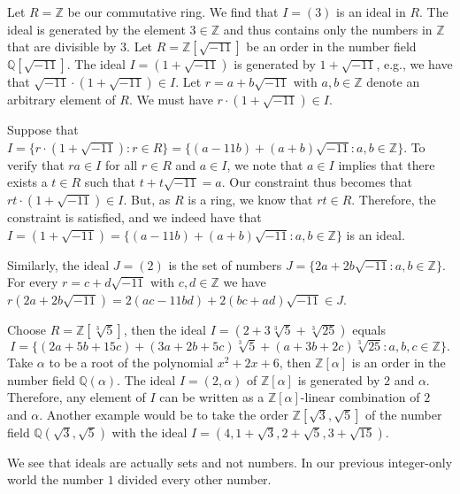 \documentclass[openany, a4paper, 10pt]{book}
\theoremstyle{plain}
\theoremstyle{plain}
\theoremstyle{plain}
\theoremstyle{definition}
\theoremstyle{plain}
\theoremstyle{definition}
\theoremstyle{remark}
\begin{document}
\begin{examplebox}
    Let $R=\mathbb Z$ be our commutative ring.
    We find that $I=(3)$ is an ideal in $R$.
    The ideal is generated by the element $3 \in \mathbb Z$ and thus contains only the numbers in $\mathbb Z$ that are divisible by 3.
    \tcbline
    Let $R=\mathbb Z[\sqrt{-11}]$ be an order in the number field $\mathbb Q[\sqrt{-11}]$.
    The ideal $I=(1+\sqrt{-11})$ is generated by $1+\sqrt{-11}$, e.g., we have that $\sqrt{-11}\cdot (1+\sqrt{-11}) \in I$.
    Let $r=a+b\sqrt{-11}$ with $a,b\in \mathbb Z$ denote an arbitrary element of $R$.
    We must have $r\cdot (1+\sqrt{-11}) \in I$.

    Suppose that
    $I = \{ r\cdot (1+\sqrt{-11}): r \in R \} = \{ (a-11b) + (a+b)\sqrt{-11}: a,b\in \mathbb Z\}$.
    To verify that $ra \in I$ for all $r \in R$ and $a \in I$, we note that $a \in I$ implies that there exists a $t \in R$ such that $t+t\sqrt{-11}=a$.
    Our constraint thus becomes that $rt\cdot (1+\sqrt{-11}) \in I$.
    But, as $R$ is a ring, we know that $rt \in R$.
    Therefore, the constraint is satisfied, and we indeed have that
    $I = (1+\sqrt{-11}) = \{ (a-11b) + (a+b)\sqrt{-11}: a,b\in \mathbb Z\}$ is an ideal.

    Similarly, the ideal $J=(2)$ is the set of numbers $J = \{ 2a + 2b\sqrt{-11}: a,b \in \mathbb Z \}$.
    For every $r=c+d\sqrt{-11}$ with $c,d \in \mathbb Z$ we have $r(2a + 2b \sqrt{-11}) = 2(ac-11bd) + 2(bc+ad)\sqrt{-11} \in J$.

    \tcbline
    Choose $R=\mathbb Z[\sqrt[3]{5}]$, then the ideal $I=(2+3\sqrt[3]{5}+\sqrt[3]{25})$ equals
    \begin{equation*}
        I = \{ (2a+5b+15c) + (3a+2b+5c)\sqrt[3]{5} + (a+3b+2c)\sqrt[3]{25}: a,b,c \in \mathbb Z \}.
    \end{equation*}
    \tcbline
    Take $\alpha$ to be a root of the polynomial $x^2+2x+6$, then
    $\mathbb Z[\alpha]$ is an order in the number field $\mathbb Q(\alpha)$.
    The ideal $I=(2,\alpha)$ of $\mathbb Z[\alpha]$ is generated by $2$ and $\alpha$.
    Therefore, any element of $I$ can be written as a $\mathbb Z[\alpha]$-linear combination of $2$ and $\alpha$.
    \tcbline
    Another example would be to take the order $\mathbb Z[\sqrt{3}, \sqrt{5}]$ of the number field $\mathbb Q(\sqrt{3}, \sqrt{5})$ with the ideal $I=(4,1+\sqrt{3},2+\sqrt{5},3+\sqrt{15})$.
\end{examplebox}
We see that ideals are actually sets and not numbers.
In our previous integer-only world the number $1$ divided every other number.
\end{document}
